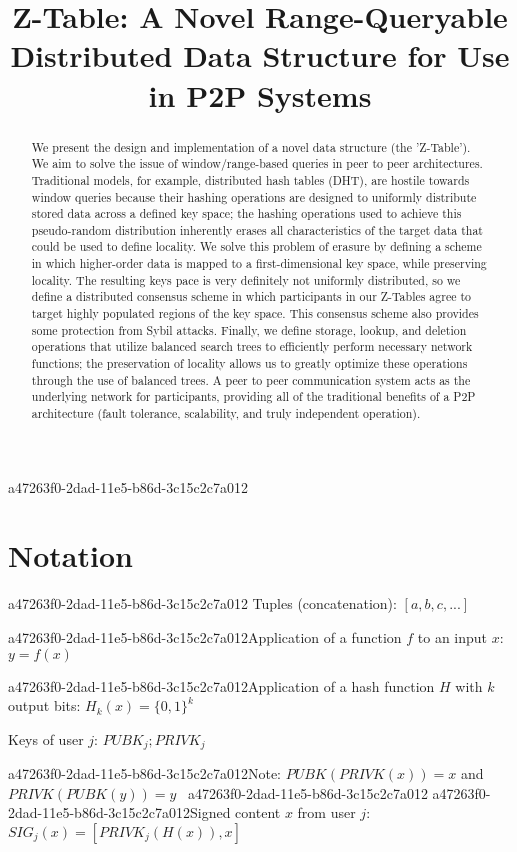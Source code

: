 \documentclass[12pt]{article}
\title{Z-Table: A Novel Range-Queryable Distributed Data Structure for Use in P2P Systems}
\begin{document}
a47263f0-2dad-11e5-b86d-3c15c2c7a012\maketitle

\begin{abstract}
We present the design and implementation of a novel data structure (the 'Z-Table'). We aim to solve the issue of window/range-based queries in peer to peer architectures. Traditional models, for example,  distributed hash tables (DHT), are hostile towards window queries because their hashing operations are designed to uniformly distribute stored data across a defined key space; the hashing operations used to achieve this pseudo-random distribution inherently erases all characteristics of the target data that could be used to define locality. We solve this problem of erasure by defining a scheme in which higher-order data is mapped to a first-dimensional key space, while preserving locality. The resulting keys pace is very definitely not uniformly distributed, so we define a distributed consensus scheme in which participants in our Z-Tables agree to target highly populated regions of the key space. This consensus scheme also provides some protection from Sybil attacks. Finally, we define storage, lookup, and deletion operations that utilize balanced search trees to efficiently perform necessary network functions; the preservation of locality allows us to greatly optimize these operations through the use of balanced trees. A peer to peer communication system acts as the underlying network for participants, providing all of the traditional benefits of a P2P architecture (fault tolerance, scalability, and truly independent operation).
\end{abstract}

\section{Notation}
a47263f0-2dad-11e5-b86d-3c15c2c7a012
Tuples (concatenation): $[a,b,c,...]$

a47263f0-2dad-11e5-b86d-3c15c2c7a012Application of a function $f$ to an input $x$: $y=f(x)$

a47263f0-2dad-11e5-b86d-3c15c2c7a012Application of a hash function $H$ with $k$ output bits: $H_{k}(x) = \{0,1\}^k$

Keys of user $j$: $ PUBK_j; PRIVK_j $

a47263f0-2dad-11e5-b86d-3c15c2c7a012Note: $PUBK(PRIVK(x)) = x$ and $PRIVK(PUBK(y)) = y$~
a47263f0-2dad-11e5-b86d-3c15c2c7a012
a47263f0-2dad-11e5-b86d-3c15c2c7a012Signed content $x$ from user $j$: $SIG_j(x) = \left[ PRIVK_j( H(x) ), x \right]$
\end{document}
